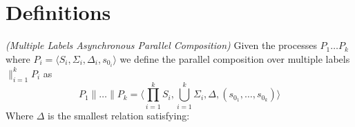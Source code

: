 \section{Definitions}

\begin{definition}
\label{def:multi-parallel-asynch-composition} \emph{(Multiple Labels Asynchronous Parallel Composition)} 
Given the processes $P_1 \ldots P_k$ where
$P_i = \langle S_i, \Sigma_i, \Delta_i, s_{0_i} \rangle$ we define the 
parallel composition over multiple labels $\parallel_{i=1}^{k}P_i$ as
\[P_1\parallel \ldots \parallel P_k = \langle \prod_{i=1}^{k} S_i, \bigcup_{i=1}^{k}\Sigma_i, \Delta, (s_{0_1}, \ldots ,s_{0_k}) \rangle \] 
Where $\Delta$ is the smallest relation satisfying:\\


\end{definition}